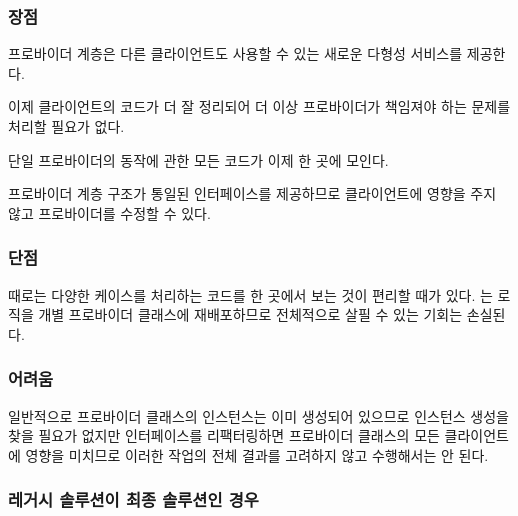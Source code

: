 \documentclass[a4paper,10pt,twoside]{book}
\begin{document}
\subsubsection*{장점}

\begin{bulletlist}
\item 프로바이더 계층은 다른 클라이언트도 사용할 수 있는 새로운 다형성 서비스를 제공한다.

\item 이제 클라이언트의 코드가 더 잘 정리되어 더 이상 프로바이더가 책임져야 하는 문제를 처리할 필요가 없다.

\item 단일 프로바이더의 동작에 관한 모든 코드가 이제 한 곳에 모인다.

\item 프로바이더 계층 구조가 통일된 인터페이스를 제공하므로 클라이언트에 영향을 주지 않고 프로바이더를 수정할 수 있다. 
\end{bulletlist}

\subsubsection*{단점}

\begin{bulletlist}
\item 때로는 다양한 케이스를 처리하는 코드를 한 곳에서 보는 것이 편리할 때가 있다. 는 로직을 개별 프로바이더 클래스에 재배포하므로 전체적으로 살필 수 있는 기회는 손실된다.
\end{bulletlist}

\subsubsection*{어려움}

\begin{bulletlist}
\item 일반적으로 프로바이더 클래스의 인스턴스는 이미 생성되어 있으므로 인스턴스 생성을 찾을 필요가 없지만 인터페이스를 리팩터링하면 프로바이더 클래스의 모든 클라이언트에 영향을 미치므로 이러한 작업의 전체 결과를 고려하지 않고 수행해서는 안 된다.
\end{bulletlist}

\subsubsection*{레거시 솔루션이 최종 솔루션인 경우}
\end{document}
